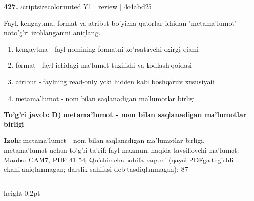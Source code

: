 \documentclass[10pt,a4paper]{article}
\begin{document}
{\bfseries\sffamily\color{ink} 427.} {scriptsizecolor{muted} Y1 | review | 4c4abd25}
\par
Fayl, kengaytma, format va atribut bo'yicha qatorlar ichidan "metama'lumot" noto'g'ri izohlanganini aniqlang.
\begin{enumerate}[label=\Alph*),leftmargin=9mm]
\item kengaytma - fayl nomining formatni ko'rsatuvchi oxirgi qismi
\item format - fayl ichidagi ma'lumot tuzilishi va kodlash qoidasi
\item atribut - faylning read-only yoki hidden kabi boshqaruv xususiyati
\item metama'lumot - nom bilan saqlanadigan ma'lumotlar birligi
\end{enumerate}
\begin{tcolorbox}[enhanced,breakable,colback=teal!4,colframe=teal!60!black,boxrule=0.45pt,arc=1.2mm,left=2.7mm,right=2.7mm,top=1.8mm,bottom=1.8mm,before skip=2mm,after skip=2mm]
{\bfseries\sffamily\color{teal}To'g'ri javob:} \textbf{D) metama'lumot - nom bilan saqlanadigan ma'lumotlar birligi}
\par\smallskip
{\bfseries Izoh:} metama'lumot - nom bilan saqlanadigan ma'lumotlar birligi. metama'lumot uchun to'g'ri ta'rif: fayl mazmuni haqida tavsiflovchi ma'lumot. Manba: CAM7, PDF 41-54; Qo'shimcha sahifa raqami (qaysi PDFga tegishli ekani aniqlanmagan; darslik sahifasi deb tasdiqlanmagan): 87
\end{tcolorbox}
\vspace{2mm}\hrule height 0.2pt\vspace{3mm}
\end{document}
